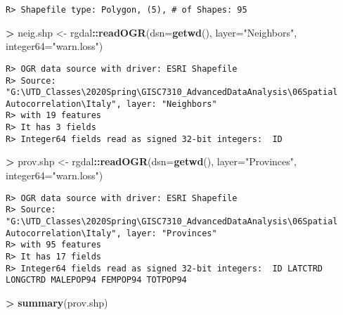 \documentclass[
]{article}
\newenvironment{Shaded}{\begin{snugshade}}{\end{snugshade}}
\newcommand{\DataTypeTok}[1]{\textcolor[rgb]{0.13,0.29,0.53}{#1}}
\newcommand{\KeywordTok}[1]{\textcolor[rgb]{0.13,0.29,0.53}{\textbf{#1}}}
\newcommand{\NormalTok}[1]{#1}
\newcommand{\OperatorTok}[1]{\textcolor[rgb]{0.81,0.36,0.00}{\textbf{#1}}}
\newcommand{\StringTok}[1]{\textcolor[rgb]{0.31,0.60,0.02}{#1}}
\begin{document}
\begin{verbatim}
R> Shapefile type: Polygon, (5), # of Shapes: 95
\end{verbatim}

\begin{Shaded}
\begin{Highlighting}[]
\OperatorTok{>}\StringTok{ }\NormalTok{neig.shp <-}\StringTok{ }\NormalTok{rgdal}\OperatorTok{::}\KeywordTok{readOGR}\NormalTok{(}\DataTypeTok{dsn=}\KeywordTok{getwd}\NormalTok{(), }\DataTypeTok{layer=}\StringTok{"Neighbors"}\NormalTok{, }\DataTypeTok{integer64=}\StringTok{"warn.loss"}\NormalTok{)}
\end{Highlighting}
\end{Shaded}

\begin{verbatim}
R> OGR data source with driver: ESRI Shapefile 
R> Source: "G:\UTD_Classes\2020Spring\GISC7310_AdvancedDataAnalysis\06Spatial Autocorrelation\Italy", layer: "Neighbors"
R> with 19 features
R> It has 3 fields
R> Integer64 fields read as signed 32-bit integers:  ID
\end{verbatim}

\begin{Shaded}
\begin{Highlighting}[]
\OperatorTok{>}\StringTok{ }\NormalTok{prov.shp <-}\StringTok{ }\NormalTok{rgdal}\OperatorTok{::}\KeywordTok{readOGR}\NormalTok{(}\DataTypeTok{dsn=}\KeywordTok{getwd}\NormalTok{(), }\DataTypeTok{layer=}\StringTok{"Provinces"}\NormalTok{, }\DataTypeTok{integer64=}\StringTok{"warn.loss"}\NormalTok{)}
\end{Highlighting}
\end{Shaded}

\begin{verbatim}
R> OGR data source with driver: ESRI Shapefile 
R> Source: "G:\UTD_Classes\2020Spring\GISC7310_AdvancedDataAnalysis\06Spatial Autocorrelation\Italy", layer: "Provinces"
R> with 95 features
R> It has 17 fields
R> Integer64 fields read as signed 32-bit integers:  ID LATCTRD LONGCTRD MALEPOP94 FEMPOP94 TOTPOP94
\end{verbatim}

\begin{Shaded}
\begin{Highlighting}[]
\OperatorTok{>}\StringTok{ }\KeywordTok{summary}\NormalTok{(prov.shp)}
\end{Highlighting}
\end{Shaded}
\end{document}
